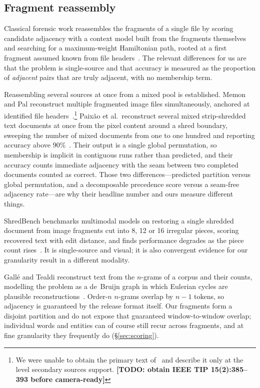 \documentclass[sigconf,review]{acmart}
\newcommand{\TODO}[1]{\textbf{[TODO: #1]}}
\begin{document}
\subsection{Fragment reassembly}
Classical forensic work reassembles the fragments of a single file by scoring
candidate adjacency with a context model built from the fragments themselves
and searching for a maximum-weight Hamiltonian path, rooted at a first fragment
assumed known from file headers~\cite{shanmugasundaram2003}. The relevant
differences for us are that the problem is single-source and that accuracy is
measured as the proportion of \emph{adjacent} pairs that are truly adjacent,
with no membership term.

Reassembling several sources at once from a mixed pool is established. Memon
and Pal reconstruct multiple fragmented image files simultaneously, anchored at
identified file headers~\cite{memonpal2006}.\footnote{We were unable to obtain
the primary text of~\cite{memonpal2006} and describe it only at the level
secondary sources support. \TODO{obtain IEEE TIP 15(2):385--393 before
camera-ready}} Paix\~{a}o et al.\ reconstruct several mixed strip-shredded text
documents at once from the pixel content around a shred boundary, sweeping the
number of mixed documents from one to one hundred and reporting accuracy above
$90\%$~\cite{paixao2020}. Their output is a single global permutation, so
membership is implicit in contiguous runs rather than predicted, and their
accuracy counts immediate adjacency with the seam between two completed
documents counted as correct. Those two differences---predicted partition
versus global permutation, and a decomposable precedence score versus a
seam-free adjacency rate---are why their headline number and ours measure
different things.

ShredBench benchmarks multimodal models on restoring a single shredded document
from image fragments cut into 8, 12 or 16 irregular pieces, scoring recovered
text with edit distance, and finds performance degrades as the piece count
rises~\cite{shredbench2026}. It is single-source and visual; it is also
convergent evidence for our granularity result in a different modality.

Gall\'{e} and Tealdi reconstruct text from the $n$-grams of a corpus and their
counts, modelling the problem as a de~Bruijn graph in which Eulerian cycles are
plausible reconstructions~\cite{galle2015}. Order-$n$ $n$-grams overlap by
$n-1$ tokens, so adjacency is guaranteed by the release format itself. Our
fragments form a disjoint partition and do not expose that guaranteed
window-to-window overlap; individual words and entities can of course still
recur across fragments, and at fine granularity they frequently do
(\S\ref{sec:scoring}).
\end{document}
